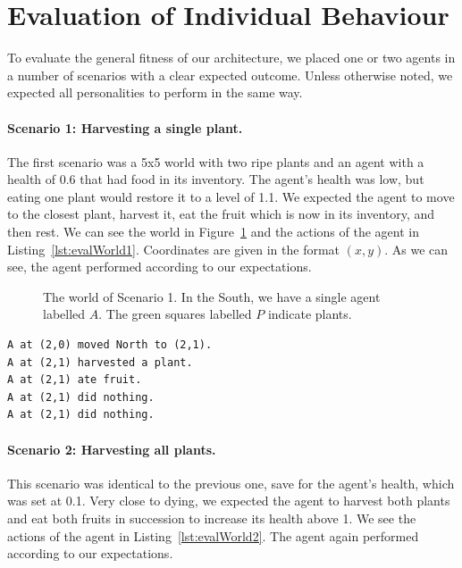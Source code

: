 \section{Evaluation of Individual Behaviour}

To evaluate the general fitness of our architecture, we placed one or two agents in a number of scenarios with a clear expected outcome. Unless otherwise noted, we expected all personalities to perform in the same way.

\paragraph{Scenario 1: Harvesting a single plant.} The first scenario was a 5x5 world with two ripe plants and an agent with a health of 0.6 that had food in its inventory. The agent's health was low, but eating one plant would restore it to a level of 1.1. We expected the agent to move to the closest plant, harvest it, eat the fruit which is now in its inventory, and then rest. We can see the world in Figure~\ref{fig:evalWorld1} and the actions of the agent in Listing~\ref{lst:evalWorld1}. Coordinates are given in the format $(x,y)$. As we can see, the agent performed according to our expectations.

\begin{figure}[t]
	\centering
	
	\caption{The world of Scenario 1. In the South, we have a single agent labelled $A$. The green squares labelled $P$ indicate plants.}
	\label{fig:evalWorld1}
\end{figure}

\begin{lstlisting}[caption=Actions in Scenario 1., label=lst:evalWorld1, float=t]
A at (2,0) moved North to (2,1).
A at (2,1) harvested a plant.
A at (2,1) ate fruit.
A at (2,1) did nothing.
A at (2,1) did nothing.
\end{lstlisting}

\paragraph{Scenario 2: Harvesting all plants.} This scenario was identical to the previous one, save for the agent's health, which was set at 0.1. Very close to dying, we expected the agent to harvest both plants and eat both fruits in succession to increase its health above 1. We see the actions of the agent in Listing~\ref{lst:evalWorld2}. The agent again performed according to our expectations.

